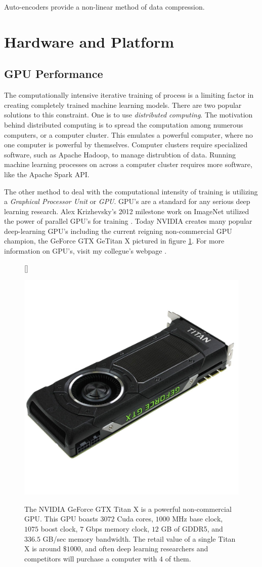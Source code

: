 \documentclass[11pt]{article}
\begin{document}
Auto-encoders provide a non-linear method of data compression.


\section{Hardware and Platform}
\subsection{GPU Performance}
The computationally intensive iterative training of process is a limiting factor in creating completely trained machine learning models. There are two popular solutions to this constraint. One is to use \emph{distributed computing}. The motivation behind distributed computing is to spread the computation among numerous computers, or a computer cluster. This emulates a powerful computer, where no one computer is powerful by themselves. Computer clusters require specialized software, such as Apache Hadoop, to manage distrubtion of data. Running machine learning processes on across a computer cluster requires more software, like the Apache Spark API.

The other method to deal with the computational intensity of training is utilizing a \emph{Graphical Processor Unit} or \emph{GPU}. GPU's are a standard for any serious deep learning research. Alex Krizhevsky's 2012 milestone work on ImageNet utilized the power of parallel GPU's for training \cite{alexnet}. Today NVIDIA creates many popular deep-learning GPU's including the current reigning non-commercial GPU champion, the GeForce GTX GeTitan X pictured in figure \ref{fig:titanx}. For more information on GPU's, visit my collegue's webpage \cite{Karan}.

\begin{figure}[H]
  [\FBwidth]
  {\caption{The NVIDIA GeForce GTX Titan X is a powerful non-commercial GPU. This GPU boasts $3072$ Cuda cores, $1000$ MHz base clock, $1075$ boost clock, $7$ Gbps memory clock, $12$ GB of GDDR5, and $336.5$ GB/sec memory bandwidth. The retail value of a single Titan X is around $\$1000$, and often deep learning researchers and competitors will purchase a computer with $4$ of them.
    }\label{fig:titanx}}{\includegraphics[width=0.65\linewidth]{titanx}}
\end{figure}
\end{document}
